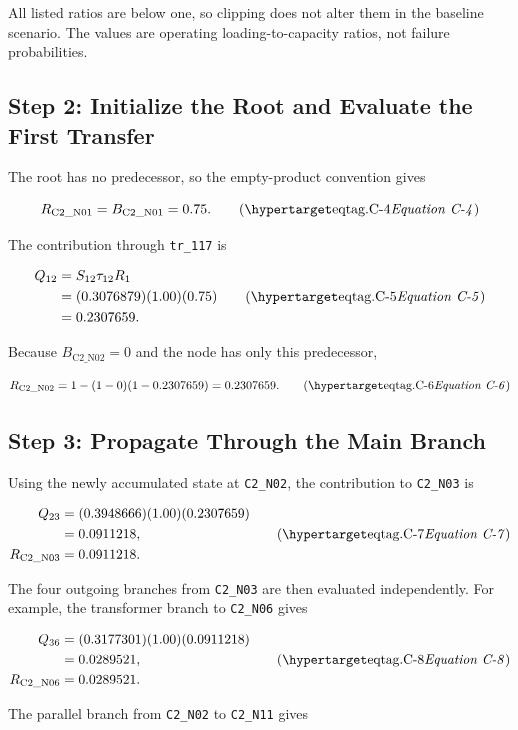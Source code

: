 All listed ratios are below one, so clipping does not alter them in the
baseline scenario. The values are operating loading-to-capacity ratios, not
failure probabilities.

\subsection{Step 2: Initialize the Root and Evaluate the First Transfer}

The root has no predecessor, so the empty-product convention gives

\[
R_{\mathrm{C2\_N01}}=B_{\mathrm{C2\_N01}}=0.75.
\eqtag{C-4}
\]

The contribution through \texttt{tr\_117} is

\[
\begin{aligned}
Q_{12}
 &=S_{12}\tau_{12}R_1\\
 &=(0.3076879)(1.00)(0.75)\\
 &=0.2307659.
\end{aligned}
\eqtag{C-5}
\]

Because \(B_{\mathrm{C2\_N02}}=0\) and the node has only this predecessor,

\[
R_{\mathrm{C2\_N02}}
=1-(1-0)(1-0.2307659)=0.2307659.
\eqtag{C-6}
\]

\subsection{Step 3: Propagate Through the Main Branch}

Using the newly accumulated state at \texttt{C2\_N02}, the contribution to
\texttt{C2\_N03} is

\[
\begin{aligned}
Q_{23}
 &=(0.3948666)(1.00)(0.2307659)\\
 &=0.0911218,\\
R_{\mathrm{C2\_N03}}
 &=0.0911218.
\end{aligned}
\eqtag{C-7}
\]

The four outgoing branches from \texttt{C2\_N03} are then evaluated
independently. For example, the transformer branch to \texttt{C2\_N06}
gives

\[
\begin{aligned}
Q_{36}
 &=(0.3177301)(1.00)(0.0911218)\\
 &=0.0289521,\\
R_{\mathrm{C2\_N06}}
 &=0.0289521.
\end{aligned}
\eqtag{C-8}
\]

The parallel branch from \texttt{C2\_N02} to \texttt{C2\_N11} gives

